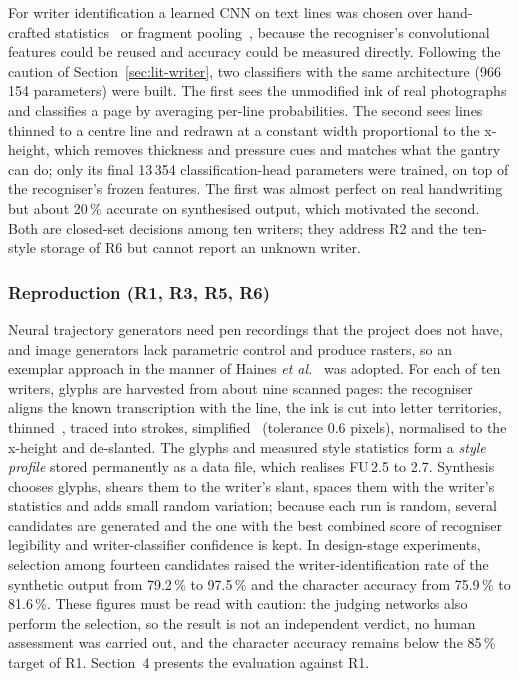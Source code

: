 For writer identification a learned CNN on text lines was chosen over hand-crafted statistics~\cite{bulacu2007} or fragment pooling~\cite{he2020}, because the recogniser's convolutional features could be reused and accuracy could be measured directly. Following the caution of Section~\ref{sec:lit-writer}, two classifiers with the same architecture (966\,154 parameters) were built. The first sees the unmodified ink of real photographs and classifies a page by averaging per-line probabilities. The second sees lines thinned to a centre line and redrawn at a constant width proportional to the x-height, which removes thickness and pressure cues and matches what the gantry can do; only its final 13\,354 classification-head parameters were trained, on top of the recogniser's frozen features. The first was almost perfect on real handwriting but about 20\,\% accurate on synthesised output, which motivated the second. Both are closed-set decisions among ten writers; they address R2 and the ten-style storage of R6 but cannot report an unknown writer.

\subsubsection{Reproduction (R1, R3, R5, R6)}

Neural trajectory generators need pen recordings that the project does not have, and image generators lack parametric control and produce rasters, so an exemplar approach in the manner of Haines \emph{et al.}~\cite{haines2016} was adopted. For each of ten writers, glyphs are harvested from about nine scanned pages: the recogniser aligns the known transcription with the line, the ink is cut into letter territories, thinned~\cite{zhang1984}, traced into strokes, simplified~\cite{douglas1973} (tolerance 0.6 pixels), normalised to the x-height and de-slanted. The glyphs and measured style statistics form a \emph{style profile} stored permanently as a data file, which realises FU\,2.5 to 2.7. Synthesis chooses glyphs, shears them to the writer's slant, spaces them with the writer's statistics and adds small random variation; because each run is random, several candidates are generated and the one with the best combined score of recogniser legibility and writer-classifier confidence is kept. In design-stage experiments, selection among fourteen candidates raised the writer-identification rate of the synthetic output from 79.2\,\% to 97.5\,\% and the character accuracy from 75.9\,\% to 81.6\,\%. These figures must be read with caution: the judging networks also perform the selection, so the result is not an independent verdict, no human assessment was carried out, and the character accuracy remains below the 85\,\% target of R1. Section~4 presents the evaluation against R1.

